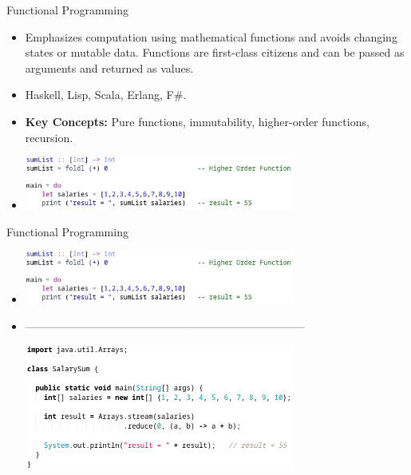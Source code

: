 \documentclass{beamer}
\begin{document}
\begin{frame}[t]{Functional Programming}
	\scriptsize
	\begin{itemize}
		\item<1-> Emphasizes computation using mathematical functions and avoids changing states or mutable data. Functions are first-class citizens and can be passed as arguments and returned as values.
		\item<2-> Haskell, Lisp, Scala, Erlang, F\#.
		\item<3-> \textbf{Key Concepts:} Pure functions, immutability, higher-order functions, recursion.
		\item<4->[]
			\vspace{1mm}
			\begin{center}
				\includegraphics[width=0.7\textwidth, height=0.17\textheight]{img/hashkel-salary-sum.png}
			\end{center}
	\end{itemize}
\end{frame}



\begin{frame}[t]{Functional Programming}
	\begin{itemize}
		\item[]
			\begin{center}
				\includegraphics[width=0.7\textwidth, height=0.25\textheight]{img/hashkel-salary-sum.png}
			\end{center}
		\item<2->[]
			---------------------------------------------------------------------------
			\begin{center}
				\includegraphics[width=0.7\textwidth, height=0.4\textheight]{img/java-sum-list.png}
			\end{center}

			
	\end{itemize}
\end{frame}
\end{document}
